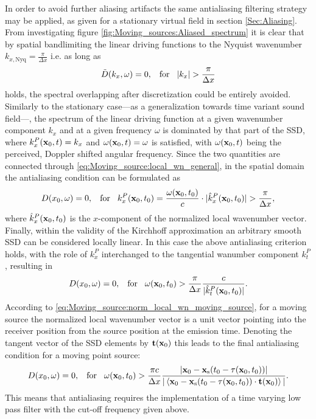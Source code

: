 In order to avoid further aliasing artifacts the same antialiasing filtering strategy may be applied, as given for a stationary virtual field in section \ref{Sec:Aliasing}.
From investigating figure \ref{fig:Moving_sources:Aliased_spectrum} it is clear that by spatial bandlimiting the linear driving functions to the Nyquist wavenumber $k_{x,\mathrm{Nyq}} = \frac{\pi}{\Delta x}$ i.e. as long as 
\begin{equation}
\tilde{D}(k_x,\omega) = 0, \hspace{3mm} \text{for} \hspace{3mm}  |k_x| > \frac{\pi}{\Delta x}
\end{equation}
holds, the spectral overlapping after discretization could be entirely avoided.
Similarly to the stationary case---as a generalization towards time variant sound field---, the spectrum of the linear driving function at a given wavenumber component $k_x$ and at a given frequency $\omega$ is dominated by that part of the SSD, where $k_x^P(\mathbf{x}_0,t) = k_x$ and $\omega(\mathbf{x}_0,t) = \omega$ is satisfied, with $\omega(\mathbf{x}_0,t)$ being the perceived, Doppler shifted angular frequency.
Since the two quantities are connected through \eqref{eq:Moving_source:local_wn_general}, in the spatial domain the antialiasing condition can be formulated as
\begin{equation}
D(x_0,\omega) = 0, \hspace{3mm} \text{for} \hspace{3mm}  k_x^P(\mathbf{x}_0,t_0) = \frac{\omega(\mathbf{x}_0,t_0)}{c} \cdot |\hat{k}_x^P(\mathbf{x}_0,t_0)|  > \frac{\pi}{\Delta x},
\end{equation}
where $\hat{k}_x^P(\mathbf{x}_0,t_0)$ is the $x$-component of the normalized local wavenumber vector.
Finally, within the validity of the Kirchhoff approximation an arbitrary smooth SSD can be considered locally linear.
In this case the above antialiasing criterion holds, with the role of $k_x^P$ interchanged to the tangential wanumber component $k_t^P$, resulting in 
\begin{equation}
D(x_0,\omega) = 0, \hspace{3mm} \text{for} \hspace{3mm} \omega(\mathbf{x}_0,t_0) > \frac{\pi}{\Delta x} \frac{c}{|\hat{k}_t^P(\mathbf{x}_0,t_0)|}.
\end{equation}
According to \eqref{eq:Moving_source:norm_local_wn_moving_source}, for a moving source the normalized local wavenumber vector is a unit vector pointing into the receiver position from the source position at the emission time.
Denoting the tangent vector of the SSD elements by $\mathbf{t}(\mathbf{x}_0)$ this leads to the final antialiasing condition for a moving point source:
\begin{equation}
D(x_0,\omega) = 0, \hspace{3mm} \text{for} \hspace{3mm} \omega(\mathbf{x}_0,t_0) > \frac{\pi c}{\Delta x} \frac{|\mathbf{x}_0-\mathbf{x}_{\mathrm{s}}(t_0-\tau(\mathbf{x}_0,t_0))|}
{|\left< \mathbf{x}_0-\mathbf{x}_{\mathrm{s}}(t_0-\tau(\mathbf{x}_0,t_0)) \cdot \mathbf{t}(\mathbf{x}_0) \right>|}.
\label{Eq:Moving_source:Antialiasing_cutoff_freq}
\end{equation}
This means that antialiasing requires the implementation of a time varying low pass filter with the cut-off frequency given above.

